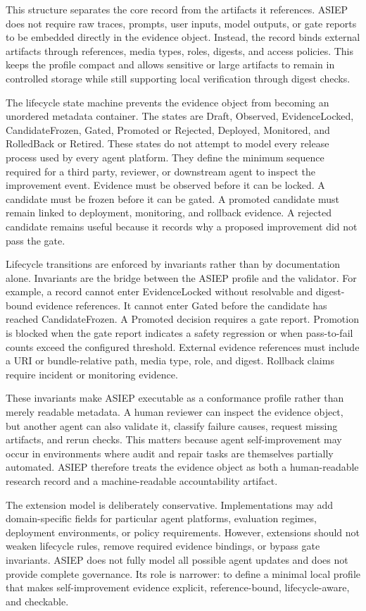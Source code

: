 This structure separates the core record from the artifacts it references. ASIEP does not require raw traces, prompts, user inputs, model outputs, or gate reports to be embedded directly in the evidence object. Instead, the record binds external artifacts through references, media types, roles, digests, and access policies. This keeps the profile compact and allows sensitive or large artifacts to remain in controlled storage while still supporting local verification through digest checks.

The lifecycle state machine prevents the evidence object from becoming an unordered metadata container. The states are Draft, Observed, EvidenceLocked, CandidateFrozen, Gated, Promoted or Rejected, Deployed, Monitored, and RolledBack or Retired. These states do not attempt to model every release process used by every agent platform. They define the minimum sequence required for a third party, reviewer, or downstream agent to inspect the improvement event. Evidence must be observed before it can be locked. A candidate must be frozen before it can be gated. A promoted candidate must remain linked to deployment, monitoring, and rollback evidence. A rejected candidate remains useful because it records why a proposed improvement did not pass the gate.

Lifecycle transitions are enforced by invariants rather than by documentation alone. Invariants are the bridge between the ASIEP profile and the validator. For example, a record cannot enter EvidenceLocked without resolvable and digest-bound evidence references. It cannot enter Gated before the candidate has reached CandidateFrozen. A Promoted decision requires a gate report. Promotion is blocked when the gate report indicates a safety regression or when pass-to-fail counts exceed the configured threshold. External evidence references must include a URI or bundle-relative path, media type, role, and digest. Rollback claims require incident or monitoring evidence.

These invariants make ASIEP executable as a conformance profile rather than merely readable metadata. A human reviewer can inspect the evidence object, but another agent can also validate it, classify failure causes, request missing artifacts, and rerun checks. This matters because agent self-improvement may occur in environments where audit and repair tasks are themselves partially automated. ASIEP therefore treats the evidence object as both a human-readable research record and a machine-readable accountability artifact.

The extension model is deliberately conservative. Implementations may add domain-specific fields for particular agent platforms, evaluation regimes, deployment environments, or policy requirements. However, extensions should not weaken lifecycle rules, remove required evidence bindings, or bypass gate invariants. ASIEP does not fully model all possible agent updates and does not provide complete governance. Its role is narrower: to define a minimal local profile that makes self-improvement evidence explicit, reference-bound, lifecycle-aware, and checkable.
